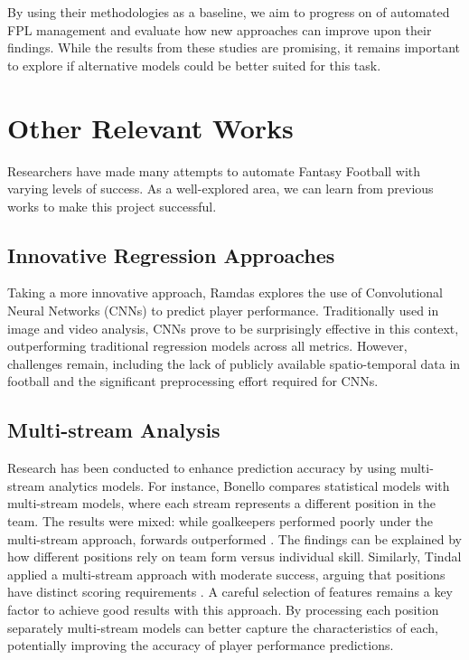 By using their methodologies as a baseline, we aim to progress on of automated FPL management and evaluate how new approaches can improve upon their findings. While the results from these studies are promising, it remains important to explore if alternative models could be better suited for this task.

\section{Other Relevant Works}

Researchers have made many attempts to automate Fantasy Football with varying levels of success. As a well-explored area, we can learn from previous works to make this project successful.

\subsection{Innovative Regression Approaches}

Taking a more innovative approach, Ramdas \cite{ramdas2023cnn} explores the use of Convolutional Neural Networks (CNNs) to predict player performance. Traditionally used in image and video analysis, CNNs prove to be surprisingly effective in this context, outperforming traditional regression models across all metrics. However, challenges remain, including the lack of publicly available spatio-temporal data in football and the significant preprocessing effort required for CNNs.

\subsection{Multi-stream Analysis}

Research has been conducted to enhance prediction accuracy by using multi-stream analytics models. For instance, Bonello compares statistical models with multi-stream models, where each stream represents a different position in the team. The results were mixed: while goalkeepers performed poorly under the multi-stream approach, forwards outperformed \cite{BonelloNicholas2019MDAf}. The findings can be explained by how different positions rely on team form versus individual skill. Similarly, Tindal applied a multi-stream approach with moderate success, arguing that positions have distinct scoring requirements \cite{tindal2023fantasyfootball}. A careful selection of features remains a key factor to achieve good results with this approach. By processing each position separately multi-stream models can better capture the characteristics of each, potentially improving the accuracy of player performance predictions.

